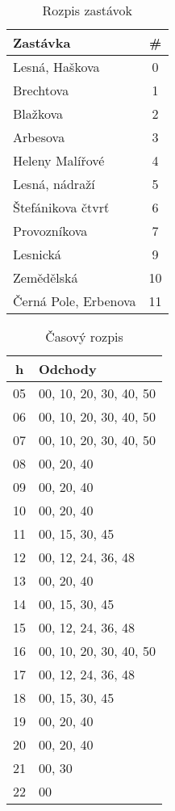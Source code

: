 \begin{table}[h]
  \centering
  \begin{tabular}{|l|c|}
    \hline
    \textbf{Zastávka} & \# \\ \hline
    Lesná, Haškova & 0 \\ \hline
    Brechtova & 1 \\ \hline
    Blažkova & 2 \\ \hline
    Arbesova & 3 \\ \hline
    Heleny Malířové & 4 \\ \hline
    Lesná, nádraží & 5 \\ \hline
    Štefánikova čtvrť & 6 \\ \hline
    Provozníkova & 7 \\ \hline
    Lesnická & 9 \\ \hline
    Zemědělská & 10 \\ \hline
    Černá Pole, Erbenova & 11 \\ \hline
  \end{tabular}
  \caption{Rozpis zastávok}
\end{table}

\begin{table}[h]
  \centering
  \begin{tabular}{|c|l|}
    \hline
     \textbf{h} & \textbf{Odchody} \\ \hline
     05 & 00, 10, 20, 30, 40, 50 \\ \hline
     06 & 00, 10, 20, 30, 40, 50 \\ \hline
     07 & 00, 10, 20, 30, 40, 50 \\ \hline
     08 & 00, 20, 40 \\ \hline
     09 & 00, 20, 40 \\ \hline
     10 & 00, 20, 40 \\ \hline
     11 & 00, 15, 30, 45 \\ \hline
     12 & 00, 12, 24, 36, 48 \\ \hline
     13 & 00, 20, 40 \\ \hline
     14 & 00, 15, 30, 45 \\ \hline
     15 & 00, 12, 24, 36, 48 \\ \hline
     16 & 00, 10, 20, 30, 40, 50 \\ \hline
     17 & 00, 12, 24, 36, 48 \\ \hline
     18 & 00, 15, 30, 45 \\ \hline
     19 & 00, 20, 40 \\ \hline
     20 & 00, 20, 40 \\ \hline
     21 & 00, 30 \\ \hline
     22 & 00 \\ \hline
  \end{tabular}
  \caption{Časový rozpis}
\end{table}

